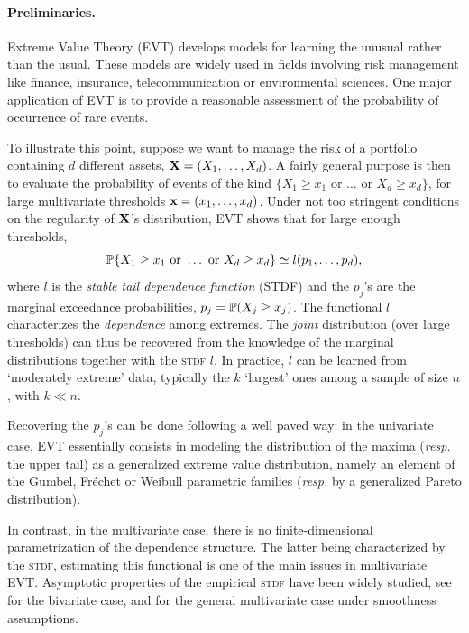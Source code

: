 \paragraph{Preliminaries.}
Extreme Value Theory (\textsc{EVT}) develops models for learning the unusual rather than the usual. These models are widely used in fields involving risk management like finance, insurance, telecommunication or environmental sciences. One major application of \textsc{EVT} is to provide a reasonable assessment of the probability of occurrence of rare events. 

To illustrate this point, suppose we want to manage the risk of a portfolio containing $d$ different assets, $\mb X = (X_1,\ldots,X_d)$. A fairly general purpose is then to evaluate the probability of events of the kind $\{X_1 \ge x_1 \text{ or }  \dotsc \text{ or } X_d\ge x_d \}$, for large multivariate thresholds $\mb x=(x_1,\ldots,x_d)$. Under not too stringent conditions on the regularity of $\mb X$'s  distribution, \textsc{EVT} shows that for large enough thresholds, 
\[
\P\{X_1 \ge x_1 \text{ or }  \dotsc \text{ or }
X_d\ge x_d \} \simeq 
l(p_1,\ldots,p_d), 
\]  
where $l$ is the  \emph{stable tail dependence function} (STDF) and the $p_j$'s  are the marginal exceedance probabilities, $p_j = \P(X_j\ge x_j)$. The functional $l$ characterizes the \emph{dependence} among extremes. The \emph{joint} distribution (over large thresholds) can thus be recovered from the knowledge of the marginal distributions  together with the \textsc{stdf} $l$. In practice, $l$ can be learned from `moderately extreme' data, typically the $k$ `largest' ones among a sample of size $n$, with $k\ll n$.

Recovering the $p_j$'s can be done following a well paved way: in the univariate case, \textsc{EVT} essentially consists in modeling the distribution of the maxima (\emph{resp.} the upper tail) as a generalized extreme value distribution, namely an element of the Gumbel, Fréchet or Weibull parametric families (\emph{resp.} by a generalized Pareto distribution).

In contrast, in the multivariate case, there is no finite-dimensional parametrization of the dependence structure. 
The latter being characterized by the \textsc{stdf}, estimating this functional is one of the main issues in multivariate \textsc{EVT}. Asymptotic properties of the empirical \textsc{stdf} have been widely studied, see \cite{Huangphd, Drees98, Embrechts2000, dHF06} for the bivariate case, and \cite{Qi97, Einmahl2012} for the general multivariate case under smoothness assumptions.

